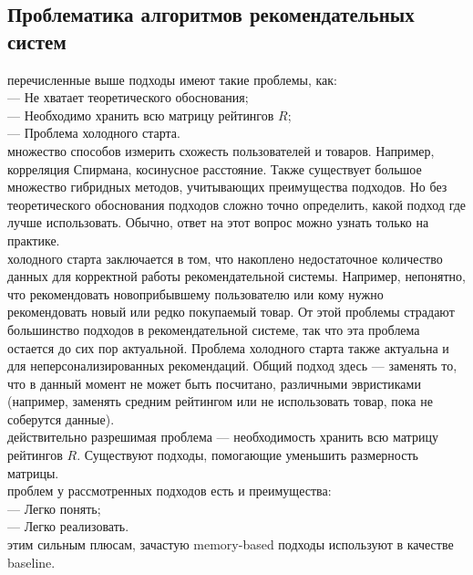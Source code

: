 \documentclass{article}
\newcommand\tab[1][1cm]{\hspace*{#1}}
\begin{document}
\subsection{Проблематика алгоритмов рекомендательных систем}
 перечисленные выше подходы имеют такие проблемы, как:\\
\tab— Не хватает теоретического обоснования;\\
\tab— Необходимо хранить всю матрицу рейтингов ﻿$R$;\\
\tab— Проблема холодного старта.\\
 множество способов измерить схожесть пользователей и товаров. Например, корреляция Спирмана, косинусное расстояние. Также существует большое множество гибридных методов, учитывающих преимущества подходов. Но без теоретического обоснования подходов сложно точно определить, какой подход где лучше использовать. Обычно, ответ на этот вопрос можно узнать только на практике.\\
 холодного старта заключается в том, что накоплено недостаточное количество данных для корректной работы рекомендательной системы. Например, непонятно, что рекомендовать новоприбывшему пользователю или кому нужно рекомендовать новый или редко покупаемый товар. От этой проблемы страдают большинство подходов в рекомендательной системе, так что эта проблема остается до сих пор актуальной. Проблема холодного старта также актуальна и для неперсонализированных рекомендаций. Общий подход здесь — заменять то, что в данный момент не может быть посчитано, различными эвристиками (например, заменять средним рейтингом или не использовать товар, пока не соберутся данные).\\
 действительно разрешимая проблема — необходимость хранить всю матрицу рейтингов ﻿$R$. Существуют подходы, помогающие уменьшить размерность матрицы.\\
 проблем у рассмотренных подходов есть и преимущества:\\
\tab— Легко понять;\\
\tab— Легко реализовать.\\
 этим сильным плюсам, зачастую memory-based подходы используют в качестве baseline.
\newpage
\end{document}
